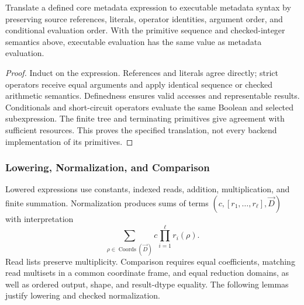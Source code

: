 \begin{lemma}
\label{lem:metadata-emission}
Translate a defined core metadata expression to executable metadata syntax
by preserving source references, literals, operator identities, argument
order, and conditional evaluation order. With the primitive sequence and
checked-integer semantics above, executable evaluation has the same value
as metadata evaluation.
\end{lemma}
\begin{proof}
Induct on the expression. References and literals agree directly; strict
operators receive equal arguments and apply identical sequence or checked
arithmetic semantics. Definedness ensures valid accesses and representable
results. Conditionals and short-circuit operators evaluate the same Boolean
and selected subexpression. The finite tree and terminating primitives give
agreement with sufficient resources. This proves the specified translation,
not every backend implementation of its primitives.
\end{proof}

\subsubsection{Lowering, Normalization, and Comparison}
Lowered expressions use constants, indexed reads, addition, multiplication,
and finite summation. Normalization produces sums of terms
$(c,[r_1,\ldots,r_\ell],\vec D)$ with interpretation
\begin{equation}
 \sum_{\rho\in\operatorname{Coords}(\vec D)}c\prod_{i=1}^{\ell}r_i(\rho).
 \label{eq:validator-term}
\end{equation}
Read lists preserve multiplicity. Comparison requires equal coefficients,
matching read multisets in a common coordinate frame, and equal reduction
domains, as well as ordered output, shape, and result-dtype equality.
The following lemmas justify lowering and checked normalization.


